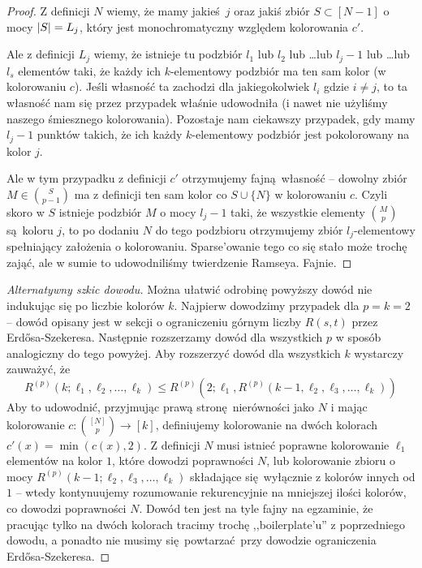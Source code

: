 \begin{proof}
	Z definicji \(N\) wiemy, że mamy jakieś \(j\) oraz jakiś zbiór \(S \subset [N-1]\) o mocy \(\card{S} = L_j\), który jest monochromatyczny względem kolorowania \(c'\).

	Ale z definicji \(L_j\) wiemy, że istnieje tu podzbiór \(l_1\) lub \(l_2\) lub \dots lub \(l_j - 1\) lub \dots lub \(l_s\) elementów taki, że każdy ich \(k\)-elementowy podzbiór ma ten sam kolor (w kolorowaniu \(c\)). Jeśli własność ta zachodzi dla jakiegokolwiek \(l_i\) gdzie \(i \neq j\), to ta własność nam się przez przypadek właśnie udowodniła (i nawet nie użyliśmy naszego śmiesznego kolorowania).
	Pozostaje nam ciekawszy przypadek, gdy mamy \(l_j - 1\) punktów takich, że ich każdy \(k\)-elementowy podzbiór jest pokolorowany na kolor \(j\).

	Ale w tym przypadku z definicji \(c'\) otrzymujemy fajną własność -- dowolny zbiór \(M \in \binom{S}{p-1}\) ma z definicji ten sam kolor co \(S \cup \{N\}\) w kolorowaniu \(c\). Czyli skoro w \(S\) istnieje podzbiór \(M\) o mocy \(l_j - 1\) taki, że wszystkie elementy \(\binom{M}{p}\) są koloru \(j\),
	to po dodaniu \(N\) do tego podzbioru otrzymujemy zbiór \(l_j\)-elementowy spełniający założenia o kolorowaniu. Sparse'owanie tego co się stało może trochę zająć, ale w sumie to udowodniliśmy twierdzenie Ramseya. Fajnie.
\end{proof}

\begin{proof}[Alternatywny szkic dowodu]
	Można ułatwić odrobinę powyższy dowód nie indukując się po liczbie kolorów \(k\).
	Najpierw dowodzimy przypadek dla \(p = k = 2\) -- dowód opisany jest w sekcji o ograniczeniu górnym liczby \(R(s, t)\) przez Erd\H{o}sa-Szekeresa.
	Następnie rozszerzamy dowód dla wszystkich \(p\) w sposób analogiczny do tego powyżej. Aby rozszerzyć dowód dla wszystkich \(k\) wystarczy zauważyć, że
	\[R^{(p)}(k; \ell_1, \ell_2, \ldots, \ell_k) \leq R^{(p)}(2; \ell_1, R^{(p)}(k-1, \ell_2, \ell_3, \ldots, \ell_k))\]
	Aby to udowodnić, przyjmując prawą stronę nierówności jako \(N\) i mając kolorowanie \(c: \binom{[N]}{p} \to [k]\), definiujemy kolorowanie na dwóch kolorach
	\(c'(x) = \min(c(x), 2)\). Z definicji \(N\) musi istnieć poprawne kolorowanie \(\ell_1\) elementów na kolor \(1\), które dowodzi poprawności \(N\),
	lub kolorowanie zbioru o mocy \(R^{(p)}(k-1; \ell_2, \ell_3, \ldots, \ell_k)\) składające się wyłącznie z kolorów innych od \(1\) --
	wtedy kontynuujemy rozumowanie rekurencyjnie na mniejszej ilości kolorów, co dowodzi poprawności \(N\).
	Dowód ten jest na tyle fajny na egzaminie, że pracując tylko na dwóch kolorach tracimy trochę ,,boilerplate'u'' z poprzedniego dowodu,
	a ponadto nie musimy się powtarzać przy dowodzie ograniczenia Erd\H{o}sa-Szekeresa.
\end{proof}
